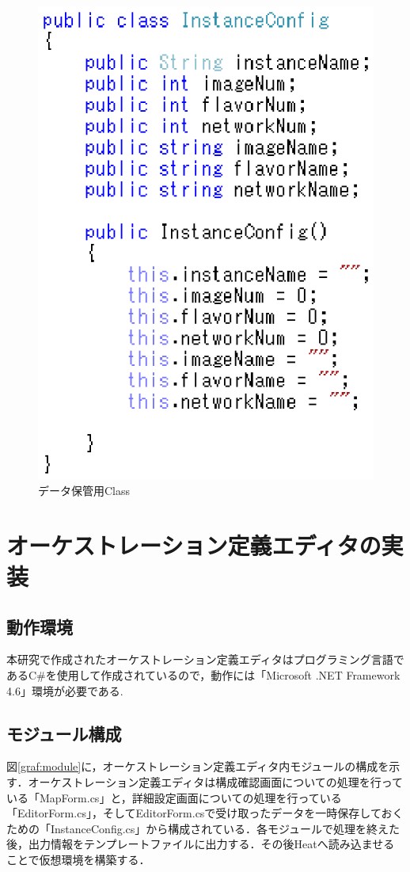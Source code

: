 \documentclass[mingoth]{kut-paper}		%
\begin{document}
	\begin{figure}[H]
		\begin{center}
			\includegraphics[scale=1.3]{Document/Source1.eps}
			\caption{データ保管用Class}
			\label{graf:3}
		\end{center}
	\end{figure}
	
\chapter{オーケストレーション定義エディタの実装}
	\section{動作環境}
	本研究で作成されたオーケストレーション定義エディタはプログラミング言語であるC\#を使用して作成されているので，動作には「Microsoft .NET Framework 4.6」環境が必要である.
	
	\section{モジュール構成}
	図\ref{graf:module}に，オーケストレーション定義エディタ内モジュールの構成を示す．オーケストレーション定義エディタは構成確認画面についての処理を行っている「MapForm.cs」と，詳細設定画面についての処理を行っている「EditorForm.cs」，そしてEditorForm.csで受け取ったデータを一時保存しておくための「InstanceConfig.cs」から構成されている．各モジュールで処理を終えた後，出力情報をテンプレートファイルに出力する．その後Heatへ読み込ませることで仮想環境を構築する．
	
\end{document}
